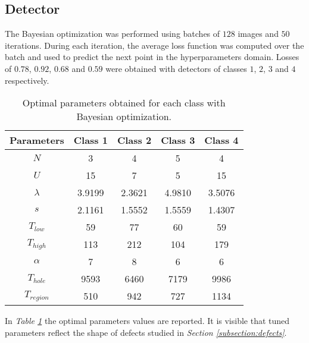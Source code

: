 \subsection{Detector}\label{section:results:detector}
\par{
	The Bayesian optimization was performed using batches of $128$ images and $50$ iterations. During each iteration, the average loss function was computed over the batch and used to predict the next point in the hyperparameters domain. Losses of $0.78$, $0.92$, $0.68$ and $0.59$ were obtained with detectors of classes $1$, $2$, $3$ and $4$ respectively.
}	
\begin{table}
	\centering
	\normalsize
	\begin{tabular}{|c|c|c|c|c|}
		\hline
		\textbf{Parameters} & \textbf{Class 1} & \textbf{Class 2} & \textbf{Class 3} & \textbf{Class 4}\\ \hline
		$N$ & 3 & 4 & 5 & 4 \\ \hline
		$U$ & 15 & 7 & 5 & 15 \\ \hline
		$\lambda$ & 3.9199 & 2.3621 & 4.9810 & 3.5076 \\ \hline
		$s$ & 2.1161 & 1.5552 & 1.5559 & 1.4307 \\ \hline
		$T_{low}$ & 59 & 77 & 60 & 59 \\ \hline
		$T_{high}$ & 113 & 212 & 104 & 179 \\ \hline
		$\alpha$ & 7 & 8 & 6 & 6 \\ \hline
		$T_{hole}$ & 9593 & 6460 & 7179 & 9986 \\ \hline
		$T_{region}$ & 510 & 942 & 727 & 1134 \\ \hline
	\end{tabular}
	\vspace{0.25cm}
	\caption{Optimal parameters obtained for each class with Bayesian optimization.}
	\label{table:params-bayesopt}
\end{table}
\par{
	In \emph{Table \ref{table:params-bayesopt}} the optimal parameters values are reported. It is visible that tuned parameters reflect the shape of defects studied in \emph{Section \ref{subsection:defects}}.
}	
